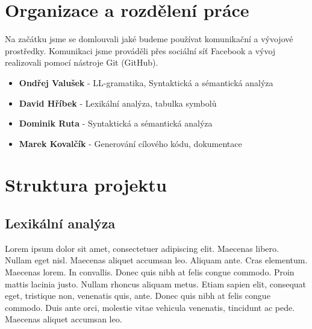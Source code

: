 \documentclass[11pt]{article}
\begin{document}
	
	
	\section{Organizace a rozdělení práce}
	
	\begin{flushleft}
		Na začátku jsme se domlouvali jaké budeme používat komunikační a vývojové prostředky. Komunikaci jsme prováděli přes sociální síť Facebook a vývoj realizovali pomocí nástroje Git (GitHub).\par
		
		\begin{itemize}
			\item \textbf{Ondřej Valušek} - LL-gramatika, Syntaktická a sémantická analýza
			\item \textbf{David Hříbek} - Lexikální analýza, tabulka symbolů
			\item \textbf{Dominik Ruta} - Syntaktická a sémantická analýza
			\item \textbf{Marek Kovalčík} - Generování cílového kódu, dokumentace
		\end{itemize}	
	\end{flushleft}

	
	\section{Struktura projektu}
	\subsection{Lexikální analýza}	
	\begin{flushleft}
		Lorem ipsum dolor sit amet, consectetuer adipiscing elit. Maecenas libero. Nullam eget nisl. Maecenas aliquet accumsan leo. Aliquam ante. Cras elementum. Maecenas lorem. In convallis. Donec quis nibh at felis congue commodo. Proin mattis lacinia justo. Nullam rhoncus aliquam metus. Etiam sapien elit, consequat eget, tristique non, venenatis quis, ante. Donec quis nibh at felis congue commodo. Duis ante orci, molestie vitae vehicula venenatis, tincidunt ac pede. Maecenas aliquet accumsan leo.\par	
	\end{flushleft}
	
\end{document}
